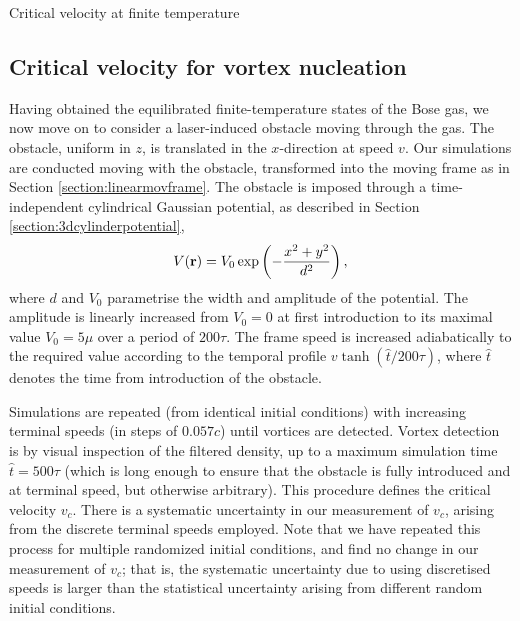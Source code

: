 \begin{chapter}{\label{cha:nonequib}Critical velocity at finite temperature}
\subsection{Critical velocity for vortex nucleation}
Having obtained the equilibrated finite-temperature states of the Bose gas, we now move on to consider a laser-induced obstacle moving through the gas.  The obstacle, uniform in $z$, is translated in the $x$-direction at speed $v$.  Our simulations are conducted moving with the obstacle, transformed into the moving frame as in Section \ref{section:linearmovframe}. The obstacle is imposed through a time-independent cylindrical Gaussian potential, as described in Section \ref{section:3dcylinderpotential},
\begin{equation*}
  V({\bf r}) = V_0 \exp\left ( -\frac{x^2+y^2}{d^2}\right ),
\end{equation*}
where $d$ and $V_0$ parametrise the width and amplitude of the potential. The amplitude is linearly increased from $V_0 = 0$ at first introduction to its maximal value $V_0=5\mu$ over a period of $200\tau$.   The frame speed is increased adiabatically to the required value according to the temporal profile $v \tanh(\hat{t}/200 \tau)$, where $\hat{t}$ denotes the time from introduction of the obstacle.

Simulations are repeated (from identical initial conditions) with increasing terminal speeds (in steps of $0.057c$) until vortices are detected.  Vortex detection is by visual inspection of the filtered density, up to a maximum simulation time $\hat{t}=500\tau$ (which is long enough to ensure that the obstacle is fully introduced and at terminal speed, but otherwise arbitrary). This procedure defines the critical velocity $v_c$.  There is a systematic uncertainty in our measurement of $v_c$, arising from the discrete terminal speeds employed.  Note that we have repeated this process for multiple randomized initial conditions, and find no change in our measurement of $v_c$; that is, the systematic uncertainty due to using discretised speeds is larger than the statistical uncertainty arising from different random initial conditions.


\end{chapter}
